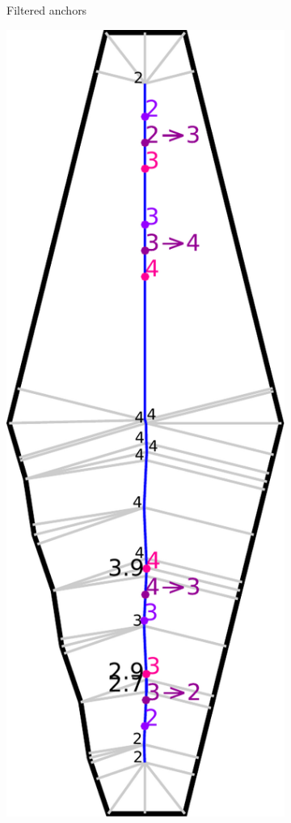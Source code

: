 \begin{figure}
\begin{subfigure}{\figwidth}
\caption{Filtered anchors}\label{beading_transitioning_filtering__filtered}
\end{subfigure}
\begin{subfigure}{\figwidth}
\includegraphics[width=\columnwidth]{sources/method/beading_transitioning_filtering__transition_ends.pdf}

\end{subfigure}
\end{figure}

